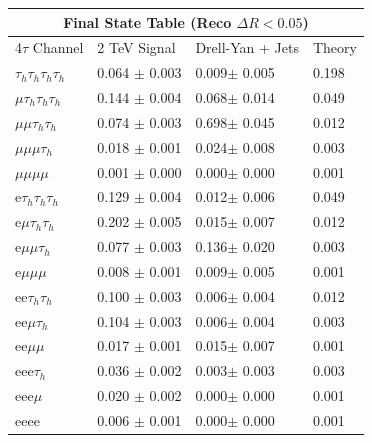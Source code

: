 \documentclass{article}
\begin{document}
 
\begin{landscape} 
\centering 
\begin{tabular}{|p{4.5cm}|p{3cm}|p{3cm}|p{3cm}|}\hline 
\multicolumn{4}{|c|}{Final State Table (Reco \(\Delta R < 0.05\))} \\ 
\hline 
4$\tau$ Channel & 2 TeV Signal & Drell-Yan + Jets & Theory \\ 
\hline 
$\tau_h$$\tau_h$$\tau_h$$\tau_h$ & 0.064 $\pm$ 0.003 & 0.009$\pm$ 0.005 & 0.198\\
\hline 
$\mu$$\tau_h$$\tau_h$$\tau_h$ & 0.144 $\pm$ 0.004 & 0.068$\pm$ 0.014 & 0.049\\
\hline 
$\mu$$\mu$$\tau_h$$\tau_h$ & 0.074 $\pm$ 0.003 & 0.698$\pm$ 0.045 & 0.012\\
\hline 
$\mu$$\mu$$\mu$$\tau_h$ & 0.018 $\pm$ 0.001 & 0.024$\pm$ 0.008 & 0.003\\
\hline 
$\mu$$\mu$$\mu$$\mu$ & 0.001 $\pm$ 0.000 & 0.000$\pm$ 0.000 & 0.001\\
\hline 
e$\tau_h$$\tau_h$$\tau_h$ & 0.129 $\pm$ 0.004 & 0.012$\pm$ 0.006 & 0.049\\
\hline 
e$\mu$$\tau_h$$\tau_h$ & 0.202 $\pm$ 0.005 & 0.015$\pm$ 0.007 & 0.012\\
\hline 
e$\mu$$\mu$$\tau_h$ & 0.077 $\pm$ 0.003 & 0.136$\pm$ 0.020 & 0.003\\
\hline 
e$\mu$$\mu$$\mu$ & 0.008 $\pm$ 0.001 & 0.009$\pm$ 0.005 & 0.001\\
\hline 
ee$\tau_h$$\tau_h$ & 0.100 $\pm$ 0.003 & 0.006$\pm$ 0.004 & 0.012\\
\hline 
ee$\mu$$\tau_h$ & 0.104 $\pm$ 0.003 & 0.006$\pm$ 0.004 & 0.003\\
\hline 
ee$\mu$$\mu$ & 0.017 $\pm$ 0.001 & 0.015$\pm$ 0.007 & 0.001\\
\hline 
eee$\tau_h$ & 0.036 $\pm$ 0.002 & 0.003$\pm$ 0.003 & 0.003\\
\hline 
eee$\mu$ & 0.020 $\pm$ 0.002 & 0.000$\pm$ 0.000 & 0.001\\
\hline 
eeee & 0.006 $\pm$ 0.001 & 0.000$\pm$ 0.000 & 0.001\\
\hline 
\end{tabular} 
\end{landscape} 
\end{document}

